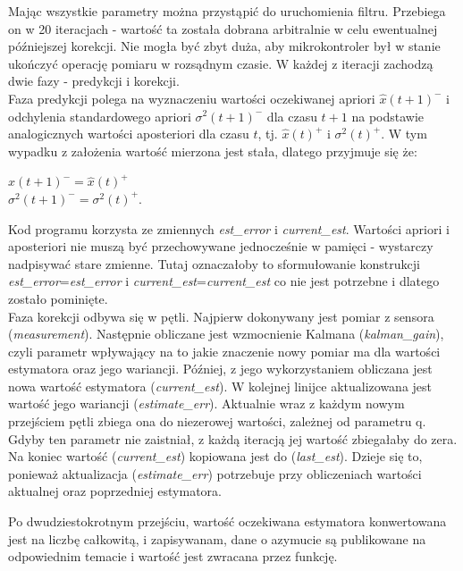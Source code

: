 Mając wszystkie parametry można przystąpić do uruchomienia filtru. Przebiega on w 20 iteracjach - wartość ta została dobrana arbitralnie w celu ewentualnej późniejszej korekcji. Nie mogła być zbyt duża, aby mikrokontroler był w stanie ukończyć operację pomiaru w rozsądnym czasie. W każdej z iteracji zachodzą dwie fazy - predykcji i korekcji.
\\

Faza predykcji polega na wyznaczeniu wartości oczekiwanej apriori $\hat{x}(t+1)^-$ i odchylenia standardowego apriori $\sigma^2(t+1)^-$ dla czasu $t+1$ na podstawie analogicznych wartości aposteriori dla czasu $t$, tj.  $\hat{x}(t)^+$ i $\sigma^2(t)^+$. W tym wypadku z założenia wartość mierzona jest stała, dlatego przyjmuje się że:
\begin{center}
    $\hat{x}(t+1)^- = \hat{x}(t)^+$ \\[5pt]
    $\sigma^2(t+1)^- = \sigma^2(t)^+$.    
\end{center}
Kod programu korzysta ze zmiennych \emph{est\_error} i \emph{current\_est}. Wartości apriori i aposteriori nie muszą być przechowywane jednocześnie w pamięci - wystarczy nadpisywać stare zmienne. Tutaj oznaczałoby to sformułowanie konstrukcji \emph{est\_error}=\emph{est\_error} i \emph{current\_est}=\emph{current\_est} co nie jest potrzebne i dlatego zostało pominięte.
\\

Faza korekcji odbywa się w pętli. Najpierw dokonywany jest pomiar z sensora (\emph{measurement}). Następnie obliczane jest wzmocnienie Kalmana (\emph{kalman\_gain}), czyli parametr wpływający na to jakie znaczenie nowy pomiar ma dla wartości estymatora oraz jego wariancji. Później, z jego wykorzystaniem obliczana jest nowa wartość estymatora (\emph{current\_est}). W kolejnej linijce aktualizowana jest wartość jego wariancji (\emph{estimate\_err}). Aktualnie wraz z każdym nowym przejściem pętli zbiega ona do niezerowej wartości, zależnej od parametru q. Gdyby ten parametr nie zaistniał, z każdą iteracją jej wartość zbiegałaby do zera. Na koniec wartość (\emph{current\_est}) kopiowana jest do (\emph{last\_est}). Dzieje się to, ponieważ aktualizacja (\emph{estimate\_err}) potrzebuje przy obliczeniach wartości aktualnej oraz poprzedniej estymatora.

Po dwudziestokrotnym przejściu, wartość oczekiwana estymatora konwertowana jest na liczbę całkowitą, i zapisywanam, dane o azymucie są publikowane na odpowiednim temacie i wartość jest zwracana przez funkcję.

